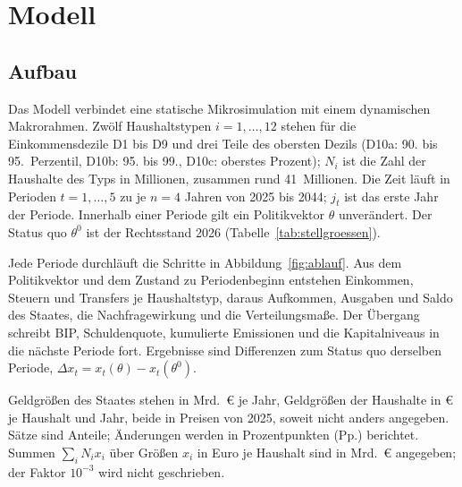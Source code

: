 
\section{Modell}
\label{sec:modell}

\subsection{Aufbau}
\label{sec:aufbau}

Das Modell verbindet eine statische Mikrosimulation mit einem dynamischen
Makrorahmen. Zwölf Haushaltstypen $i = 1,\dots,12$ stehen für die
Einkommensdezile D1 bis D9 und drei Teile des obersten Dezils (D10a: 90.
bis 95.~Perzentil, D10b: 95. bis 99., D10c: oberstes Prozent); $N_i$ ist die
Zahl der Haushalte des Typs in Millionen, zusammen rund 41~Millionen. Die Zeit
läuft in Perioden $t = 1,\dots,5$ zu je $n = 4$ Jahren von 2025 bis 2044;
$j_t$ ist das erste Jahr der Periode. Innerhalb einer Periode gilt ein
Politikvektor $\theta$ unverändert. Der Status quo $\theta^0$ ist der
Rechtsstand 2026 (Tabelle~\ref{tab:stellgroessen}).

Jede Periode durchläuft die Schritte in Abbildung~\ref{fig:ablauf}. Aus dem
Politikvektor und dem Zustand zu Periodenbeginn entstehen Einkommen, Steuern
und Transfers je Haushaltstyp, daraus Aufkommen, Ausgaben und Saldo des
Staates, die Nachfragewirkung und die Verteilungsmaße. Der Übergang schreibt
BIP, Schuldenquote, kumulierte Emissionen und die Kapitalniveaus in die
nächste Periode fort. Ergebnisse sind Differenzen zum Status quo derselben
Periode, $\Delta x_t = x_t(\theta) - x_t(\theta^0)$.

Geldgrößen des Staates stehen in Mrd.~\euro{} je Jahr, Geldgrößen der
Haushalte in \euro{} je Haushalt und Jahr, beide in Preisen von 2025, soweit
nicht anders angegeben. Sätze sind Anteile; Änderungen werden in
Prozentpunkten (Pp.) berichtet. Summen $\sum_i N_i x_i$ über Größen $x_i$ in
Euro je Haushalt sind in Mrd.~\euro{} angegeben; der Faktor $10^{-3}$ wird
nicht geschrieben.

